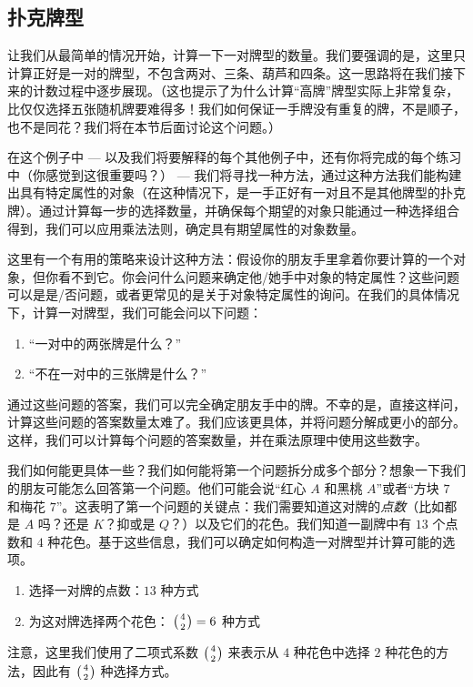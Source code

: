 
\subsection{扑克牌型}

\begin{example}[一对]

    让我们从最简单的情况开始，计算一下一对牌型的数量。我们要强调的是，这里只计算正好是一对的牌型，不包含两对、三条、葫芦和四条。这一思路将在我们接下来的计数过程中逐步展现。（这也提示了为什么计算``高牌''牌型实际上非常复杂，比仅仅选择五张随机牌要难得多！我们如何保证一手牌没有重复的牌，不是顺子，也不是同花？我们将在本节后面讨论这个问题。）

    在这个例子中 --- 以及我们将要解释的每个其他例子中，还有你将完成的每个练习中（你感觉到这很重要吗？） --- 我们将寻找一种方法，通过这种方法我们能构建出具有特定属性的对象（在这种情况下，是一手正好有一对且不是其他牌型的扑克牌）。通过计算每一步的选择数量，并确保每个期望的对象只能通过一种选择组合得到，我们可以应用乘法法则，确定具有期望属性的对象数量。

    这里有一个有用的策略来设计这种方法：假设你的朋友手里拿着你要计算的一个对象，但你看不到它。你会问什么问题来确定他/她手中对象的特定属性？这些问题可以是是/否问题，或者更常见的是关于对象特定属性的询问。在我们的具体情况下，计算一对牌型，我们可能会问以下问题：
    \begin{enumerate}[label=(\arabic*)]
        \item ``一对中的两张牌是什么？''
        \item ``不在一对中的三张牌是什么？''
    \end{enumerate}
    通过这些问题的答案，我们可以完全确定朋友手中的牌。不幸的是，直接这样问，计算这些问题的答案数量太难了。我们应该更具体，并将问题分解成更小的部分。这样，我们可以计算每个问题的答案数量，并在乘法原理中使用这些数字。

    我们如何能更具体一些？我们如何能将第一个问题拆分成多个部分？想象一下我们的朋友可能怎么回答第一个问题。他们可能会说``红心 $A$ 和黑桃 $A$''或者``方块 $7$ 和梅花 $7$''。这表明了第一个问题的关键点：我们需要知道这对牌的\emph{点数}（比如都是 $A$ 吗？还是 $K$？抑或是 $Q$？）以及它们的花色。我们知道一副牌中有 $13$ 个点数和 $4$ 种花色。基于这些信息，我们可以确定如何构造一对牌型并计算可能的选项。
    \begin{enumerate}
        \item 选择一对牌的点数：$13$ 种方式
        \item 为这对牌选择两个花色： $\big({4 \atop 2}\big) = 6$ 种方式
    \end{enumerate}
    注意，这里我们使用了二项式系数 $\big({4 \atop 2}\big)$ 来表示从 $4$ 种花色中选择 $2$ 种花色的方法，因此有 $\big({4 \atop 2}\big)$ 种选择方式。


\end{example}
